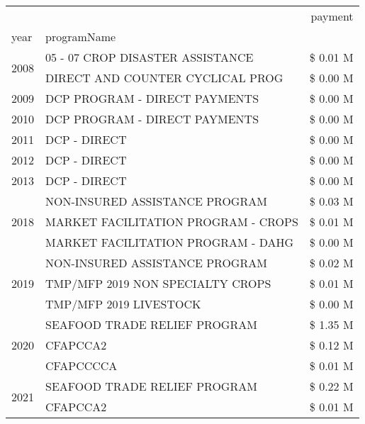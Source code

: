 \begin{tabular}{llr}
\toprule
 &  & payment \\
year & programName &  \\
\midrule
\multirow[t]{2}{*}{2008} & 05 - 07 CROP DISASTER ASSISTANCE & \$ 0.01 M \\
 & DIRECT AND COUNTER CYCLICAL PROG & \$ 0.00 M \\
\cline{1-3}
2009 & DCP PROGRAM - DIRECT PAYMENTS & \$ 0.00 M \\
\cline{1-3}
2010 & DCP PROGRAM - DIRECT PAYMENTS & \$ 0.00 M \\
\cline{1-3}
2011 & DCP - DIRECT & \$ 0.00 M \\
\cline{1-3}
2012 & DCP - DIRECT & \$ 0.00 M \\
\cline{1-3}
2013 & DCP - DIRECT & \$ 0.00 M \\
\cline{1-3}
\multirow[t]{3}{*}{2018} & NON-INSURED ASSISTANCE PROGRAM & \$ 0.03 M \\
 & MARKET FACILITATION PROGRAM - CROPS & \$ 0.01 M \\
 & MARKET FACILITATION PROGRAM - DAHG & \$ 0.00 M \\
\cline{1-3}
\multirow[t]{3}{*}{2019} & NON-INSURED ASSISTANCE PROGRAM & \$ 0.02 M \\
 & TMP/MFP 2019 NON SPECIALTY CROPS & \$ 0.01 M \\
 & TMP/MFP 2019 LIVESTOCK & \$ 0.00 M \\
\cline{1-3}
\multirow[t]{3}{*}{2020} & SEAFOOD TRADE RELIEF PROGRAM & \$ 1.35 M \\
 & CFAPCCA2 & \$ 0.12 M \\
 & CFAPCCCCA & \$ 0.01 M \\
\cline{1-3}
\multirow[t]{2}{*}{2021} & SEAFOOD TRADE RELIEF PROGRAM & \$ 0.22 M \\
 & CFAPCCA2 & \$ 0.01 M \\
\cline{1-3}
\bottomrule
\end{tabular}
